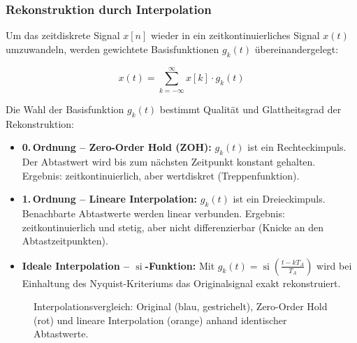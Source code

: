 \subsubsection*{Rekonstruktion durch Interpolation}

Um das zeitdiskrete Signal $x[n]$ wieder in ein zeitkontinuierliches Signal $x(t)$ umzuwandeln,
werden gewichtete Basisfunktionen $g_k(t)$ übereinandergelegt:

$$
x(t) = \sum_{k=-\infty}^{\infty} x[k] \cdot g_k(t)
$$

Die Wahl der Basisfunktion $g_k(t)$ bestimmt Qualität und Glattheitsgrad der Rekonstruktion:

\begin{itemize}
    \item \textbf{0.\,Ordnung – Zero-Order Hold (ZOH):} $g_k(t)$ ist ein Rechteckimpuls. Der
          Abtastwert wird bis zum nächsten Zeitpunkt konstant gehalten. Ergebnis: zeitkontinuierlich,
          aber wertdiskret (Treppenfunktion).
    \item \textbf{1.\,Ordnung – Lineare Interpolation:} $g_k(t)$ ist ein Dreieckimpuls. Benachbarte
          Abtastwerte werden linear verbunden. Ergebnis: zeitkontinuierlich und stetig,
          aber nicht differenzierbar (Knicke an den Abtastzeitpunkten).
    \item \textbf{Ideale Interpolation – $\operatorname{si}$-Funktion:} Mit
          $g_k(t) = \operatorname{si}\!\left(\tfrac{t - k T_A}{T_A}\right)$ wird bei Einhaltung
          des Nyquist-Kriteriums das Originalsignal exakt rekonstruiert.
\end{itemize}

\begin{figure}[H]
\centering
{}
\caption{Interpolationsvergleich: Original (blau, gestrichelt), Zero-Order Hold (rot) und lineare
Interpolation (orange) anhand identischer Abtastwerte.}
\end{figure}

